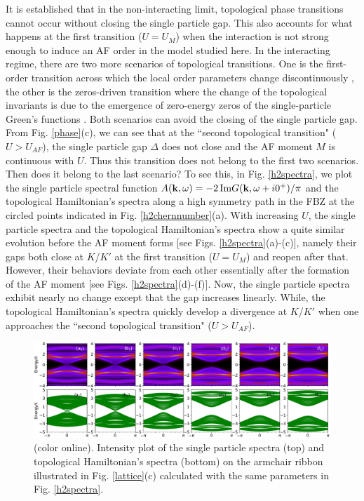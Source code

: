 \documentclass[12pt]{iopart}
\begin{document}
\par It is established that in the non-interacting limit, topological phase transitions cannot occur without closing the single particle gap. This also accounts for what happens at the first transition ($U=U_M$) when the interaction is not strong enough to induce an AF order in the model studied here. In the interacting regime, there are two more scenarios of topological transitions. One is the first-order transition across which the local order parameters change discontinuously \cite{BTS_PRB2013,ZSWZ_PRB2015,ABCTS_PRL2015}, the other is the zeros-driven transition where the change of the topological invariants is due to the emergence of zero-energy zeros of the single-particle Green's functions \cite{G_PRB2011,BTLLZ_PRB2012,SK_PRB2018}. Both scenarios can avoid the closing of the single particle gap. From Fig. \ref{phase}(c), we can see that at the ``second topological transition" ($U>U_{AF}$), the single particle gap $\Delta$ does not close and the AF moment $M$ is continuous with $U$. Thus this transition does not belong to the first two scenarios. Then does it belong to the last scenario? To see this, in Fig. \ref{h2spectra}, we plot the single particle spectral function $A(\mathbf{k},\omega)=-2\,{\rm Im} G(\mathbf{k},\omega+i0^+)/\pi$ and the topological Hamiltonian's spectra along a high symmetry path in the FBZ at the circled points indicated in Fig. \ref{h2chernnumber}(a). With increasing $U$, the single particle spectra and the topological Hamiltonian's spectra show a quite similar evolution before the AF moment forms [see Figs. \ref{h2spectra}(a)-(c)], namely their gaps both close at $K$/$K'$ at the first transition ($U=U_{M}$) and reopen after that. However, their behaviors deviate from each other essentially after the formation of the AF moment [see Figs. \ref{h2spectra}(d)-(f)]. Now, the single particle spectra exhibit nearly no change except that the gap increases linearly. While, the topological Hamiltonian's spectra quickly develop a divergence at $K$/$K'$ when one approaches the ``second topological transition" ($U>U_{AF}$).

\begin{figure}
\centering
\includegraphics[scale=0.4]{edge}
\caption{(color online). Intensity plot of the single particle spectra (top) and topological Hamiltonian's spectra (bottom) on the armchair ribbon illustrated in Fig. \ref{lattice}(c) calculated with the same parameters in Fig. \ref{h2spectra}.}\label{edge}
\end{figure}
\end{document}
